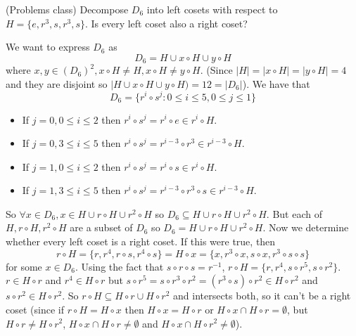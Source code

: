 \begin{example}
	(Problems class) Decompose $D_6$ into left cosets with respect to $H = \{ e, r^3, s, r^3, s \}$. Is every left coset also a right coset?

	We want to express $D_6$ as
	\[
		D_6 = H \cup x \circ H \cup y \circ H
	\]
	where $x, y \in {(D_6)}^2, x \circ H \ne H, x \circ H \ne y \circ H$. (Since $|H| = |x \circ H| = |y \circ H| = 4$ and they are disjoint so $|H \cup x \circ H \cup y \circ H) = 12 = |D_6|$). We have that
	\[
		D_6 = \{ r^i  \circ s^j: 0 \le i \le 5, 0 \le j \le 1 \}
	\]
	\begin{itemize}
		\item If $j = 0, 0 \le i \le 2$ then $r^i \circ s^j = r^i \circ e \in r^i \circ H$.
		\item If $j = 0, 3 \le i \le 5$ then $r^i \circ s^j = r^{i - 3} \circ r^3 \in r^{i - 3} \circ H$.
		\item If $j = 1, 0 \le i \le 2$ then $r^i \circ s^j = r^i \circ s \in r^i \circ H$.
		\item If $j = 1, 3 \le i \le 5$ then $r^i \circ s^j = r^{i - 3} \circ r^3 \circ s \in r^{i - 3} \circ H$.
	\end{itemize}
	So $\forall x \in D_6, x \in H \cup r \circ H \cup r^2 \circ H$ so $D_6 \subseteq H \cup r \circ H \cup r^2 \circ H$. But each of $H, r \circ H, r^2 \circ H$ are a subset of $D_6$ so $D_6 = H \cup r \circ H \cup r^2 \circ H$. Now we determine whether every left coset is a right coset. If this were true, then
	\[
		r \circ H = \{ r, r^4, r \circ s, r^4 \circ s \} = H \circ x = \{ x, r^3 \circ x, s \circ x, r^3 \circ s \circ s \}
	\]
	for some $x \in D_6$. Using the fact that $s \circ r \circ s = r^{-1}$, $r \circ H = \{ r, r^4, s \circ r^5, s \circ r^2 \}$. $r \in H \circ r$ and $r^4 \in H \circ r$ but $s \circ r^5 = s \circ r^3 \circ r^2 = (r^3 \circ s) \circ r^2 \in H \circ r^2$ and $s \circ r^2 \in H \circ r^2$. So $r \circ H \subseteq H \circ r \cup H \circ r^2$ and intersects both, so it can't be a right coset (since if $r \circ H = H \circ x$ then $H \circ x = H \circ r$ or $H \circ x \cap H \circ r = \emptyset$, but $H \circ r \ne H \circ r^2$, $H \circ x \cap H \circ r \ne \emptyset$ and $H \circ x \cap H \circ r^2 \ne \emptyset$).
\end{example}

